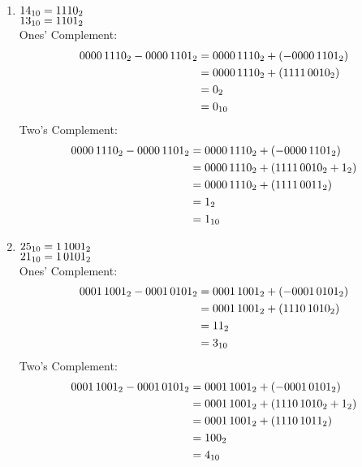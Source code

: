 \documentclass{gadsescript}
\begin{document}
\begin{enumerate}[label=\alph*)]
	\item $\decnum{14} = \binnum{00001110}$\\
		$ \decnum{13} = \binnum{00001101} $\\
		Ones' Complement:
		\begin{align*}
			\binnum[8]{00001110} - \binnum[8]{00001101} &= \binnum[8]{00001110} + (-\binnum[8]{00001101})\\
			~&= \binnum[8]{00001110} + (\binnum{11110010} )\\
			~&= \binnum{0}\\
			~&= \decnum{0}
		\end{align*}
		Two's Complement:
		\begin{align*}
			\binnum[8]{00001110} - \binnum[8]{00001101} &= \binnum[8]{00001110} + (-\binnum[8]{00001101})\\
			~&= \binnum[8]{00001110} + (\binnum{11110010} + \binnum{1} )\\
			~&= \binnum[8]{00001110} + (\binnum{11110011} )\\
			~&= \binnum{1}\\
			~&= \decnum{1}
		\end{align*}

	\item $\decnum{25} = \binnum{11001}$\\
		$ \decnum{21} = \binnum{10101} $\\
		Ones' Complement:
		\begin{align*}
			\binnum[8]{11001} - \binnum[8]{10101} &= \binnum[8]{11001} + (-\binnum[8]{10101})\\
			~&= \binnum[8]{11001} + (\binnum{11101010} )\\
			~&= \binnum{11}\\
			~&= \decnum{3}
		\end{align*}
		Two's Complement:
		\begin{align*}
			\binnum[8]{11001} - \binnum[8]{10101} &= \binnum[8]{11001} + (-\binnum[8]{10101})\\
			~&= \binnum[8]{11001} + (\binnum{11101010} + \binnum{1} )\\
			~&= \binnum[8]{11001} + (\binnum{11101011} )\\
			~&= \binnum{100}\\
			~&= \decnum{4}
		\end{align*}
\end{enumerate}
\end{document}
